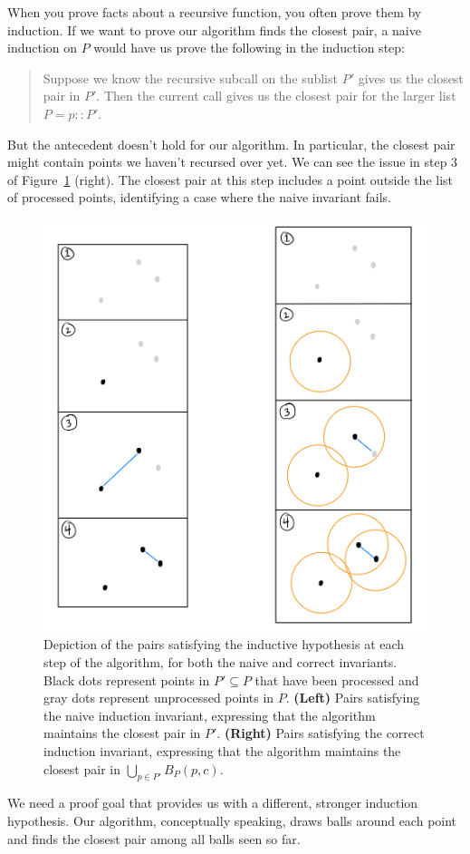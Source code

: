 \documentclass{article}
\begin{document}
When you prove facts about a recursive function, you often prove them by induction.
If we want to prove our algorithm finds the closest pair, a naive induction on $P$ would have us prove the following in the induction step:
\begin{quote}
  Suppose we know the recursive subcall on the sublist $P'$ gives us the closest pair in $P'$.
  Then the current call gives us the closest pair for the larger list $P = p :: P'$.
\end{quote}
But the antecedent doesn't hold for our algorithm.
In particular, the closest pair might contain points we haven't recursed over yet.
We can see the issue in step 3 of Figure~\ref{fig:aux_invariant} (right).
The closest pair at this step includes a point outside the list of processed points, identifying a case where the naive invariant fails.
\begin{figure}[H]\label{fig:aux_invariant}
  \begin{center}
  \includegraphics[width=0.5\linewidth]{res/aux_invariant}
  \end{center}
  \caption{
    Depiction of the pairs satisfying the inductive hypothesis at each step of the algorithm, for both the naive and correct invariants.
    Black dots represent points in $P' \subseteq P$ that have been processed and gray dots represent unprocessed points in $P$.
    \textbf{(Left)}
      Pairs satisfying the naive induction invariant, expressing that the algorithm maintains the closest pair in $P'$.
    \textbf{(Right)}
      Pairs satisfying the correct induction invariant, expressing that the algorithm maintains the closest pair in $\bigcup_{p \in P'}B_P(p, c)$.
  }
\end{figure}
We need a proof goal that provides us with a different, stronger induction hypothesis.
Our algorithm, conceptually speaking, draws balls around each point and finds the closest pair among all balls seen so far.
\end{document}
